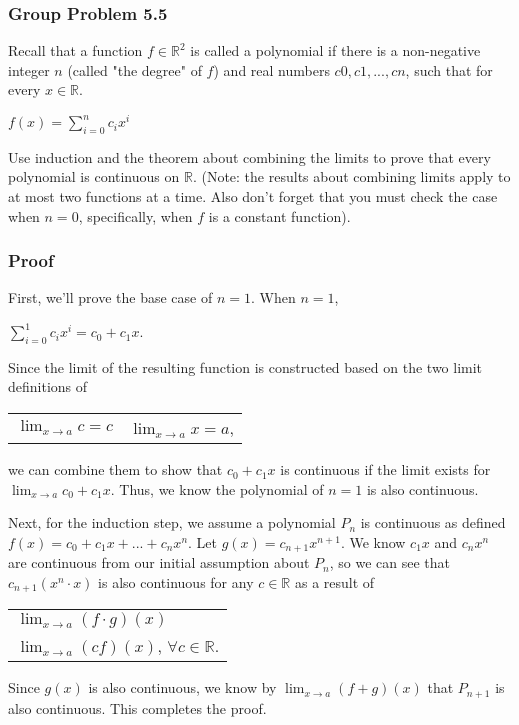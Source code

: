 \documentclass{article}
\begin{document}

\subsubsection*{Group Problem 5.5}
\begin{flushleft}
Recall that a function $f \in \mathbb{R}^2$ is called a polynomial if there is a non-negative integer $n$ (called "the degree" of $f$) and real numbers $c0, c1, ..., cn$, such that for every $x \in \mathbb{R}$.
\begin{center}
$f(x) = \sum_{i=0}^{n} c_ix^i$
\end{center}
Use induction and the theorem about combining the limits to prove that every polynomial is continuous on $\mathbb{R}$. (Note: the results about combining limits apply to at most two functions at a time. Also don't forget that you must check the case when $n = 0$, specifically, when $f$ is a constant function).
\end{flushleft}

\subsubsection*{Proof}
\begin{flushleft}
First, we'll prove the base case of $n=1$. When $n=1$,
\begin{center}
$\sum_{i=0}^{1} c_ix^i = c_0 + c_1x$.
\end{center}
Since the limit of the resulting function is constructed based on the two limit definitions of
\begin{center}
\begin{tabular}{c c}
$\lim_{x \to a} c = c$ & $\lim_{x \to a} x = a$,
\end{tabular}
\end{center}
we can combine them to show that $c_0 + c_1x$ is continuous if the limit exists for $\lim_{x \to a} c_0 + c_1x$. Thus, we know the polynomial of $n=1$ is also continuous.

\vspace{1.5cm}

Next, for the induction step, we assume a polynomial $P_n$ is continuous as defined $f(x) = c_0 + c_1x + ... + c_nx^n$. Let $g(x)=c_{n+1}x^{n+1}$. We know $c_1x$ and $c_nx^n$ are continuous from our initial assumption about $P_n$, so we can see that $c_{n+1}(x^n \cdot x)$ is also continuous for any $c \in \mathbb{R}$ as a result of 

\begin{center}
\begin{tabular}{l}
$\lim_{x \to a} (f \cdot g)(x)$ \\
$\lim_{x \to a} (cf)(x)$, $\forall c \in \mathbb{R}$. \\
\end{tabular}
\end{center}

Since $g(x)$ is also continuous, we know by $\lim_{x \to a} (f + g)(x)$ that $P_{n+1}$ is also continuous. This completes the proof.
\end{flushleft}

\end{document}
